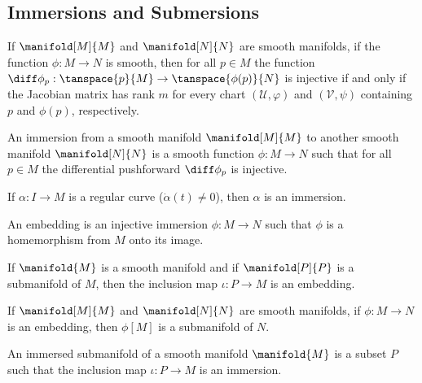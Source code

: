 \documentclass{article}                                                        %
\begin{document}
        \subsection{Immersions and Submersions}
            \begin{theorem}
                If $\manifold[M]{M}$ and $\manifold[N]{N}$ are smooth manifolds,
                if the function $\phi:M\rightarrow{N}$ is smooth, then for all
                $p\in{M}$ the function
                $\diff\phi_{p}:\tanspace{p}{M}\rightarrow\tanspace{\phi(p)}{N}$
                is injective if and only if the Jacobian matrix has rank $m$ for
                every chart $(\mathcal{U},\varphi)$ and $(\mathcal{V},\psi)$
                containing $p$ and $\phi(p)$, respectively.
            \end{theorem}
            \begin{definition}
                An immersion from a smooth manifold $\manifold[M]{M}$ to another
                smooth manifold $\manifold[N]{N}$ is a smooth function
                $\phi:M\rightarrow{N}$ such that for all $p\in{M}$ the
                differential pushforward $\diff\phi_{p}$ is injective.
            \end{definition}
            \begin{theorem}
                If $\alpha:I\rightarrow{M}$ is a regular curve
                ($\dot{\alpha}(t)\ne{0}$), then $\alpha$ is an immersion.
            \end{theorem}
            \begin{definition}
                An embedding is an injective immersion $\phi:M\rightarrow{N}$
                such that $\phi$ is a homemorphism from $M$ onto its image.
            \end{definition}
            \begin{theorem}
                If $\manifold{M}$ is a smooth manifold and if $\manifold[P]{P}$
                is a submanifold of $M$, then the inclusion map
                $\iota:P\rightarrow{M}$ is an embedding.
            \end{theorem}
            \begin{theorem}
                If $\manifold[M]{M}$ and $\manifold[N]{N}$ are smooth manifolds,
                if $\phi:M\rightarrow{N}$ is an embedding, then $\phi[M]$ is a
                submanifold of $N$.
            \end{theorem}
            \begin{definition}
                An immersed submanifold of a smooth manifold $\manifold{M}$ is
                a subset $P$ such that the inclusion map $\iota:P\rightarrow{M}$
                is an immersion.
            \end{definition}
\end{document}
